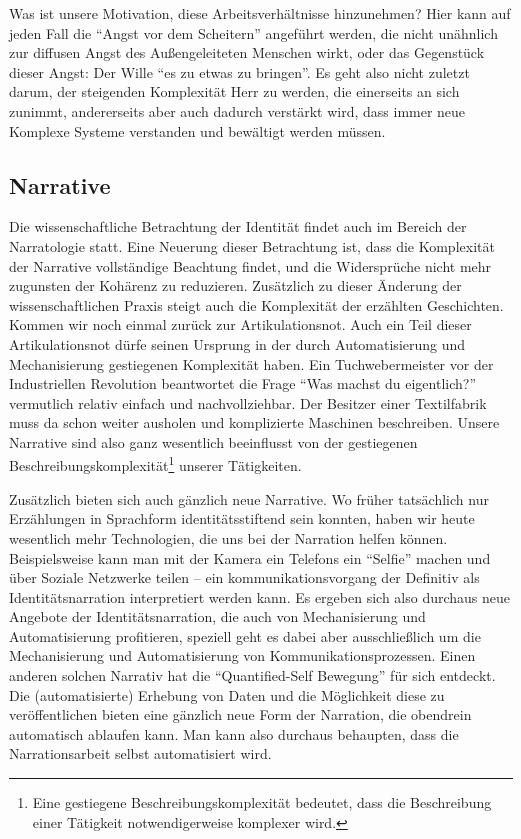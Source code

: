 Was ist unsere Motivation, diese Arbeitsverhältnisse hinzunehmen?
Hier kann auf jeden Fall die \enquote{Angst vor dem Scheitern} angeführt werden\parencite[159ff.]{sennett}, die nicht unähnlich zur diffusen Angst des Außengeleiteten Menschen wirkt, oder das Gegenstück dieser Angst: Der Wille \enquote{es zu etwas zu bringen}.
Es geht also nicht zuletzt darum, der steigenden Komplexität Herr zu werden, die einerseits an sich zunimmt, andererseits aber auch dadurch verstärkt wird, dass immer neue Komplexe Systeme verstanden und bewältigt werden müssen.


\subsection{Narrative}

Die wissenschaftliche Betrachtung der Identität findet auch im Bereich der Narratologie statt.
Eine Neuerung dieser Betrachtung ist, dass die Komplexität der Narrative vollständige Beachtung findet, und die Widersprüche nicht mehr zugunsten der Kohärenz zu reduzieren\parencite[164]{kraus}.
Zusätzlich zu dieser Änderung der wissenschaftlichen Praxis steigt auch die Komplexität der erzählten Geschichten.
Kommen wir noch einmal zurück zur Artikulationsnot. Auch ein Teil dieser Artikulationsnot dürfe seinen Ursprung in der durch Automatisierung und Mechanisierung gestiegenen Komplexität haben.
Ein Tuchwebermeister vor der Industriellen Revolution beantwortet die Frage \enquote{Was machst du eigentlich?} vermutlich relativ einfach und nachvollziehbar.
Der Besitzer einer Textilfabrik muss da schon weiter ausholen und komplizierte Maschinen beschreiben.
Unsere Narrative sind also ganz wesentlich beeinflusst von der gestiegenen Beschreibungskomplexität\footnote{Eine gestiegene Beschreibungskomplexität bedeutet, dass die Beschreibung einer Tätigkeit notwendigerweise komplexer wird.} unserer Tätigkeiten.

Zusätzlich bieten sich auch gänzlich neue Narrative.
Wo früher tatsächlich nur Erzählungen in Sprachform identitätsstiftend sein konnten, haben wir heute wesentlich mehr Technologien, die uns bei der Narration helfen können.
Beispielsweise kann man mit der Kamera ein Telefons ein \enquote{Selfie} machen und über Soziale Netzwerke teilen – ein kommunikationsvorgang der Definitiv als Identitätsnarration interpretiert werden kann\parencite{iqani}.
Es ergeben sich also durchaus neue Angebote der Identitätsnarration, die auch von Mechanisierung und Automatisierung profitieren, speziell geht es dabei aber ausschließlich um die Mechanisierung und Automatisierung von Kommunikationsprozessen.
Einen anderen solchen Narrativ hat die \enquote{Quantified-Self Bewegung} für sich entdeckt\parencite{bellinger}.
Die (automatisierte) Erhebung von Daten und die Möglichkeit diese zu veröffentlichen bieten eine gänzlich neue Form der Narration, die obendrein automatisch ablaufen kann.
Man kann also durchaus behaupten, dass die Narrationsarbeit selbst automatisiert wird.


